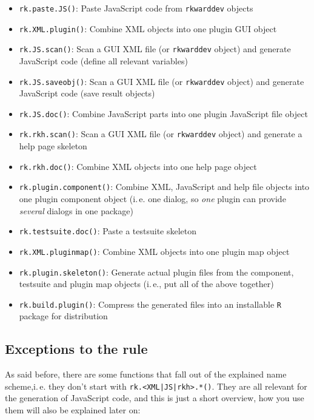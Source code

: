 \documentclass[a4paper,10pt]{scrartcl}
\begin{document}
\begin{itemize}
	\item  \texttt{rk.paste.JS()}: Paste JavaScript code from  \texttt{rkwarddev} objects
	\item  \texttt{rk.XML.plugin()}: Combine XML objects into one plugin GUI object
	\item  \texttt{rk.JS.scan()}: Scan a GUI XML file (or  \texttt{rkwarddev} object) and generate JavaScript code
		(define all relevant variables)
	\item  \texttt{rk.JS.saveobj()}: Scan a GUI XML file (or  \texttt{rkwarddev} object) and generate JavaScript code
		(save result objects)
	\item  \texttt{rk.JS.doc()}: Combine JavaScript parts into one plugin JavaScript file object
	\item  \texttt{rk.rkh.scan()}: Scan a GUI XML file (or  \texttt{rkwarddev} object) and generate a help page skeleton
	\item  \texttt{rk.rkh.doc()}: Combine XML objects into one help page object
	\item  \texttt{rk.plugin.component()}: Combine XML, JavaScript and help file objects into one plugin component object
		(i.\,e. one dialog, so \textit{one} plugin can provide \textit{several} dialogs in one package)
	\item  \texttt{rk.testsuite.doc()}: Paste a testsuite skeleton
	\item  \texttt{rk.XML.pluginmap()}: Combine XML objects into one plugin map object
	\item  \texttt{rk.plugin.skeleton()}: Generate actual plugin files from the component,
		testsuite and plugin map objects (i.\,e., put all of the above together)
	\item  \texttt{rk.build.plugin()}: Compress the generated files into an installable  \texttt{R} package for
		distribution
\end{itemize}

\subsection{Exceptions to the rule}
As said before, there are some functions that fall out of the explained name scheme,i.\,e. they don't start with
\texttt{rk.<XML|JS|rkh>.*()}. They are all relevant for the generation of JavaScript code, and this is just a short overview,
how you use them will also be explained later on:
\end{document}
